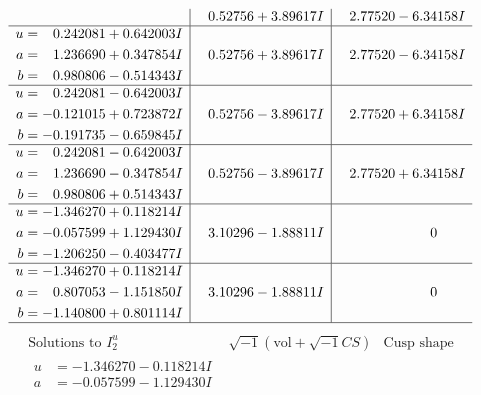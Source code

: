 \documentclass[1p]{elsarticle_modified}
\theoremstyle{definition}
\newcommand{\I}{\sqrt{-1}}
\begin{document}
$$\begin{array}{c|c|c}
 & \phantom{-}0.52756 + 3.89617 I & \phantom{-}2.77520 - 6.34158 I \\ \hline\begin{aligned}
u &= \phantom{-}0.242081 + 0.642003 I \\
a &= \phantom{-}1.236690 + 0.347854 I \\
b &= \phantom{-}0.980806 - 0.514343 I\end{aligned}
 & \phantom{-}0.52756 + 3.89617 I & \phantom{-}2.77520 - 6.34158 I \\ \hline\begin{aligned}
u &= \phantom{-}0.242081 - 0.642003 I \\
a &= -0.121015 + 0.723872 I \\
b &= -0.191735 - 0.659845 I\end{aligned}
 & \phantom{-}0.52756 - 3.89617 I & \phantom{-}2.77520 + 6.34158 I \\ \hline\begin{aligned}
u &= \phantom{-}0.242081 - 0.642003 I \\
a &= \phantom{-}1.236690 - 0.347854 I \\
b &= \phantom{-}0.980806 + 0.514343 I\end{aligned}
 & \phantom{-}0.52756 - 3.89617 I & \phantom{-}2.77520 + 6.34158 I \\ \hline\begin{aligned}
u &= -1.346270 + 0.118214 I \\
a &= -0.057599 + 1.129430 I \\
b &= -1.206250 - 0.403477 I\end{aligned}
 & \phantom{-}3.10296 - 1.88811 I & \phantom{-0.000000 } 0 \\ \hline\begin{aligned}
u &= -1.346270 + 0.118214 I \\
a &= \phantom{-}0.807053 - 1.151850 I \\
b &= -1.140800 + 0.801114 I\end{aligned}
 & \phantom{-}3.10296 - 1.88811 I & \phantom{-0.000000 } 0\\
 \hline 
 \end{array}$$\newpage$$\begin{array}{c|c|c}  
\text{Solutions to }I^u_{2}& \I (\text{vol} + \sqrt{-1}CS) & \text{Cusp shape}\\
 \hline 
\begin{aligned}
u &= -1.346270 - 0.118214 I \\
a &= -0.057599 - 1.129430 I \\

\end{aligned}
\end{array}$$
\end{document}
